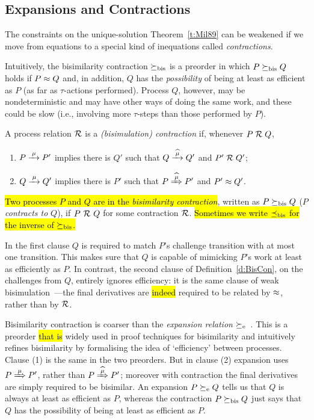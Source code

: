 \subsection{Expansions and Contractions}
\label{s:mcontr}

The constraints on the unique-solution Theorem~\ref{t:Mil89} can be 
weakened if we move from equations to a special kind of inequations called
  \emph{contractions}.

Intuitively, the bisimilarity contraction $\mathrel{\succeq_{\rm{bis}}}$ is a preorder in which 
$P \mathrel{\succeq_{\rm{bis}}} Q  $  holds  if $P \approx Q$ and, in addition, 
$Q$ has the \emph{possibility} of being at least as efficient as $P$ (as far as
$\tau$-actions performed). 
Process $Q$, however, may be nondeterministic and may have other ways
of doing the same work, and these could be  slow (i.e., involving
more $\tau$-steps than those performed by $P$).

\begin{definition}%
\label{d:BisCon}
A process relation ${{\cal R}}$ 
 is a \emph{(bisimulation) contraction} if, whenever
 $P\mathrel{\cal R} Q$, %

\begin{enumerate}
\item   $P \arr\mu P'$ implies there is $Q'$ such that $Q \arcap \mu
  Q'$ and $P' \mathrel{\cal R} Q'$;
\item $Q \arr\mu Q'$   implies there is $P'$ such that $P \Arcap \mu
 P'$ and $P' \approx Q'$\enspace.
\end{enumerate}
\hl{Two processes $P$ and $Q$ are in the \emph{bisimilarity
    contraction}}, written as $P \mathrel{\succeq_{\rm{bis}}} Q$ ($P$ \emph{contracts to} $Q$),
if $P\ {\cal R}\ Q$ for some contraction ${\cal R}$.
\hl{Sometimes we write $\mathrel{\preceq_{\rm{bis}}}$ for the inverse of $\mathrel{\succeq_{\rm{bis}}}$.}
\end{definition}

In the first clause $Q$ is required to match $P$'s challenge
transition with at most one transition.
This makes sure that $Q$ is capable of mimicking $P$'s
work at least as efficiently as $P$. 
In contrast, the second clause of Definition~\ref{d:BisCon}, on the
challenges from $Q$, entirely ignores efficiency: it is the same
clause of  weak bisimulation~---the final derivatives are \hl{indeed} required
to be related  by $\approx$, rather than by ${\cal R}$.

Bisimilarity  contraction is coarser than 
the \emph{expansion relation} $\mathrel{\succeq_{\rm{e}}}$~\cite{arun1992efficiency,sangiorgi2015equations}.
This is a preorder \hl{that is} widely used in proof techniques for bisimilarity and
intuitively refines bisimilarity by 
formalising the idea of `efficiency' between processes.
Clause (1) is the same in the two
preorders. But in clause (2) expansion uses 
$P \Arr \mu P'$, rather than $P \Arcap \mu P'$; 
 moreover with
contraction the final derivatives are simply required to be bisimilar.
An expansion 
$P \mathrel{\succeq_{\rm{e}}} Q$
tells us  that $Q$ is always at least as efficient as $P$, whereas  the
 contraction $P \mathrel{\succeq_{\rm{bis}}} Q$  just says that $Q$ has the possibility of
being at least as efficient as $P$. 

